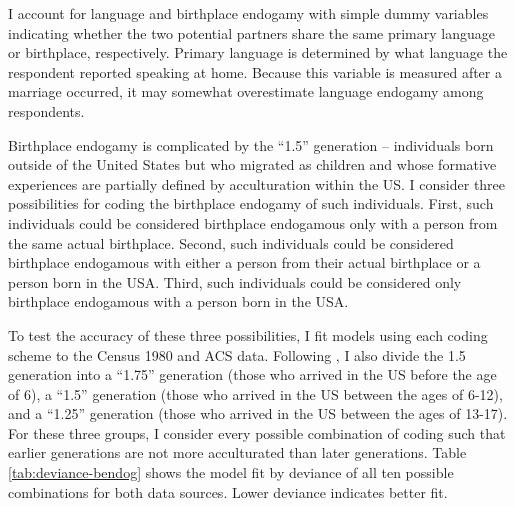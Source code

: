 \documentclass[11pt,]{article}
\begin{document}
I account for language and birthplace endogamy with simple dummy variables indicating whether the two potential partners share the same primary language or birthplace, respectively. Primary language is determined by what language the respondent reported speaking at home. Because this variable is measured after a marriage occurred, it may somewhat overestimate language endogamy among respondents.

Birthplace endogamy is complicated by the ``1.5'' generation -- individuals born outside of the United States but who migrated as children and whose formative experiences are partially defined by acculturation within the US. I consider three possibilities for coding the birthplace endogamy of such individuals. First, such individuals could be considered birthplace endogamous only with a person from the same actual birthplace. Second, such individuals could be considered birthplace endogamous with either a person from their actual birthplace or a person born in the USA. Third, such individuals could be considered only birthplace endogamous with a person born in the USA.

To test the accuracy of these three possibilities, I fit models using each coding scheme to the Census 1980 and ACS data. Following \citet{rumbaut_ages_2004a}, I also divide the 1.5 generation into a ``1.75'' generation (those who arrived in the US before the age of 6), a ``1.5'' generation (those who arrived in the US between the ages of 6-12), and a ``1.25'' generation (those who arrived in the US between the ages of 13-17). For these three groups, I consider every possible combination of coding such that earlier generations are not more acculturated than later generations. Table \ref{tab:deviance-bendog} shows the model fit by deviance of all ten possible combinations for both data sources. Lower deviance indicates better fit.
\end{document}

